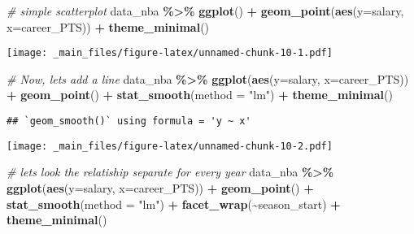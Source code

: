 \documentclass[
]{book}
\newenvironment{Shaded}{\begin{snugshade}}{\end{snugshade}}
\newcommand{\AttributeTok}[1]{\textcolor[rgb]{0.13,0.29,0.53}{#1}}
\newcommand{\CommentTok}[1]{\textcolor[rgb]{0.56,0.35,0.01}{\textit{#1}}}
\newcommand{\FunctionTok}[1]{\textcolor[rgb]{0.13,0.29,0.53}{\textbf{#1}}}
\newcommand{\NormalTok}[1]{#1}
\newcommand{\SpecialCharTok}[1]{\textcolor[rgb]{0.81,0.36,0.00}{\textbf{#1}}}
\newcommand{\StringTok}[1]{\textcolor[rgb]{0.31,0.60,0.02}{#1}}
\begin{document}
\begin{Shaded}
\begin{Highlighting}[]
\CommentTok{\# simple scatterplot}
\NormalTok{data\_nba }\SpecialCharTok{\%\textgreater{}\%} \FunctionTok{ggplot}\NormalTok{() }\SpecialCharTok{+}
\FunctionTok{geom\_point}\NormalTok{(}\FunctionTok{aes}\NormalTok{(}\AttributeTok{y=}\NormalTok{salary, }\AttributeTok{x=}\NormalTok{career\_PTS)) }\SpecialCharTok{+} 
  \FunctionTok{theme\_minimal}\NormalTok{()}
\end{Highlighting}
\end{Shaded}

\texttt{[image: \_main\_files/figure-latex/unnamed-chunk-10-1.pdf]}

\begin{Shaded}
\begin{Highlighting}[]
\CommentTok{\# Now, let\textquotesingle{}s add a line}
\NormalTok{data\_nba }\SpecialCharTok{\%\textgreater{}\%} 
  \FunctionTok{ggplot}\NormalTok{(}\FunctionTok{aes}\NormalTok{(}\AttributeTok{y=}\NormalTok{salary, }\AttributeTok{x=}\NormalTok{career\_PTS)) }\SpecialCharTok{+}
    \FunctionTok{geom\_point}\NormalTok{() }\SpecialCharTok{+} 
     \FunctionTok{stat\_smooth}\NormalTok{(}\AttributeTok{method =} \StringTok{"lm"}\NormalTok{) }\SpecialCharTok{+} 
       \FunctionTok{theme\_minimal}\NormalTok{()}
\end{Highlighting}
\end{Shaded}

\begin{verbatim}
## `geom_smooth()` using formula = 'y ~ x'
\end{verbatim}

\texttt{[image: \_main\_files/figure-latex/unnamed-chunk-10-2.pdf]}

\begin{Shaded}
\begin{Highlighting}[]
\CommentTok{\# let\textquotesingle{}s look the relatiship separate for every year}
\NormalTok{data\_nba }\SpecialCharTok{\%\textgreater{}\%} 
  \FunctionTok{ggplot}\NormalTok{(}\FunctionTok{aes}\NormalTok{(}\AttributeTok{y=}\NormalTok{salary, }\AttributeTok{x=}\NormalTok{career\_PTS)) }\SpecialCharTok{+}
    \FunctionTok{geom\_point}\NormalTok{() }\SpecialCharTok{+} 
     \FunctionTok{stat\_smooth}\NormalTok{(}\AttributeTok{method =} \StringTok{"lm"}\NormalTok{) }\SpecialCharTok{+} 
        \FunctionTok{facet\_wrap}\NormalTok{(}\SpecialCharTok{\textasciitilde{}}\NormalTok{season\_start) }\SpecialCharTok{+} 
       \FunctionTok{theme\_minimal}\NormalTok{()}
\end{Highlighting}
\end{Shaded}
\end{document}
